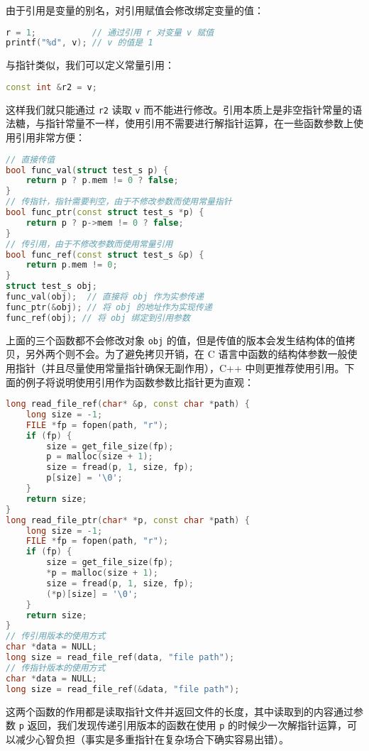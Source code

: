 \documentclass[hyperref,UTF8]{article}
\begin{document}
由于引用是变量的别名，对引用赋值会修改绑定变量的值：
\begin{lstlisting}[language=c++]
r = 1;           // 通过引用 r 对变量 v 赋值
printf("%d", v); // v 的值是 1
\end{lstlisting}
与指针类似，我们可以定义常量引用：
\begin{lstlisting}[language=c++]
const int &r2 = v;
\end{lstlisting}
这样我们就只能通过 \texttt{r2} 读取 \texttt{v} 而不能进行修改。引用本质上是非空指针常量的语法糖，与指针常量不一样，使用引用不需要进行解指针运算，在一些函数参数上使用引用非常方便：
\begin{lstlisting}[language=c++]
// 直接传值
bool func_val(struct test_s p) {
    return p ? p.mem != 0 ? false;
}
// 传指针，指针需要判空，由于不修改参数而使用常量指针
bool func_ptr(const struct test_s *p) {
    return p ? p->mem != 0 ? false;
}
// 传引用，由于不修改参数而使用常量引用
bool func_ref(const struct test_s &p) {
    return p.mem != 0;
}
struct test_s obj;
func_val(obj);  // 直接将 obj 作为实参传递
func_ptr(&obj); // 将 obj 的地址作为实现传递
func_ref(obj); // 将 obj 绑定到引用参数
\end{lstlisting}
上面的三个函数都不会修改对象 \texttt{obj} 的值，但是传值的版本会发生结构体的值拷贝，另外两个则不会。为了避免拷贝开销，在 C 语言中函数的结构体参数一般使用指针（并且尽量使用常量指针确保无副作用），C++ 中则更推荐使用引用。下面的例子将说明使用引用作为函数参数比指针更为直观：
\begin{lstlisting}[language=c++]
long read_file_ref(char* &p, const char *path) {
    long size = -1;
    FILE *fp = fopen(path, "r");
    if (fp) {
        size = get_file_size(fp);
        p = malloc(size + 1);
        size = fread(p, 1, size, fp);
        p[size] = '\0';
    }
    return size;
}
long read_file_ptr(char* *p, const char *path) {
    long size = -1;
    FILE *fp = fopen(path, "r");
    if (fp) {
        size = get_file_size(fp);
        *p = malloc(size + 1);
        size = fread(p, 1, size, fp);
        (*p)[size] = '\0';
    }
    return size;
}
// 传引用版本的使用方式
char *data = NULL;
long size = read_file_ref(data, "file path");
// 传指针版本的使用方式
char *data = NULL;
long size = read_file_ref(&data, "file path");
\end{lstlisting}
这两个函数的作用都是读取指针文件并返回文件的长度，其中读取到的内容通过参数 \texttt{p} 返回，我们发现传递引用版本的函数在使用 \texttt{p} 的时候少一次解指针运算，可以减少心智负担（事实是多重指针在复杂场合下确实容易出错）。
\end{document}
